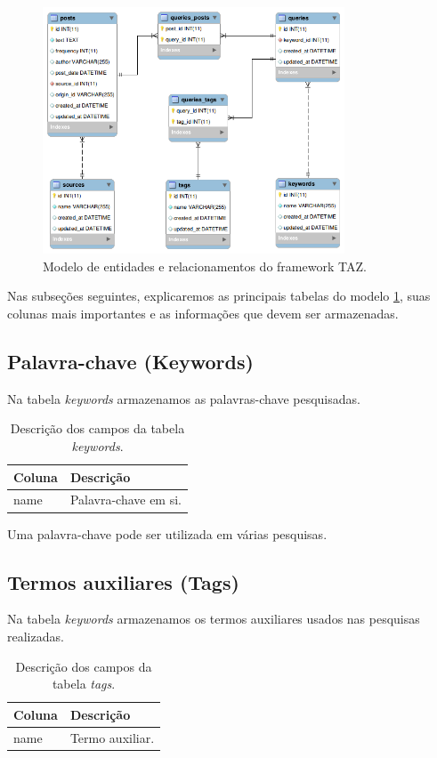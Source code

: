 \begin{figure}[htb]
\centering
\includegraphics[width=0.8\textwidth]{images/modeloTAZ.png}
\caption{Modelo de entidades e relacionamentos do framework TAZ.}
\label{fig: modeloTAZ}
\end{figure}

Nas subseções seguintes, explicaremos as principais tabelas do modelo \ref{fig: modeloTAZ}, suas colunas mais importantes e as informações que devem ser armazenadas.

\subsection{Palavra-chave (Keywords)}
\label{subsec: Keywords}
Na tabela \textit{keywords} armazenamos as palavras-chave pesquisadas.
\begin{table}[ht]
    \begin{tabular}{|p{3cm}|p{12cm}|}
        \hline
        \rowcolor[HTML]{CFCFCF} 
        Coluna      & Descrição  \\ \hline
        name        & Palavra-chave em si. \\ \hline
    \end{tabular}
    \caption{Descrição dos campos da tabela \textit{keywords}.}
    \label{fig: DescricaoTabelaPalavrasChave}
\end{table}

Uma palavra-chave pode ser utilizada em várias pesquisas.

\subsection{Termos auxiliares (Tags)}
\label{subsec: Tags}
Na tabela \textit{keywords} armazenamos os termos auxiliares usados nas pesquisas realizadas.
\begin{table}[ht]
    \begin{tabular}{|p{3cm}|p{12cm}|}
        \hline
        \rowcolor[HTML]{CFCFCF} 
        Coluna      & Descrição  \\ \hline
        name        & Termo auxiliar. \\ \hline
    \end{tabular}
    \caption{Descrição dos campos da tabela \textit{tags}.}
    \label{fig: DescricaoTabelaTermosAuxiliares}
\end{table}

